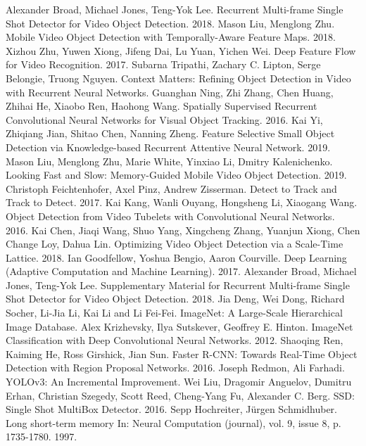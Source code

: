 \documentclass[conference]{IEEEtran}
\begin{document}
\begin{thebibliography}{00}
 Alexander Broad, Michael Jones, Teng-Yok Lee. Recurrent Multi-frame Single Shot Detector for Video Object Detection. 2018.
 Mason Liu, Menglong Zhu. Mobile Video Object Detection with Temporally-Aware Feature Maps. 2018.
 Xizhou Zhu, Yuwen Xiong, Jifeng Dai, Lu Yuan, Yichen Wei. Deep Feature Flow for Video Recognition. 2017.
 Subarna Tripathi, Zachary C. Lipton, Serge Belongie, Truong Nguyen. Context Matters: Refining Object Detection in Video with Recurrent Neural Networks.
 Guanghan Ning, Zhi Zhang, Chen Huang, Zhihai He, Xiaobo Ren, Haohong Wang. Spatially Supervised Recurrent Convolutional Neural Networks for Visual Object Tracking. 2016.
 Kai Yi, Zhiqiang Jian, Shitao Chen, Nanning Zheng. Feature Selective Small Object Detection via Knowledge-based Recurrent Attentive Neural Network. 2019.
 Mason Liu, Menglong Zhu, Marie White, Yinxiao Li, Dmitry Kalenichenko. Looking Fast and Slow: Memory-Guided Mobile Video Object Detection. 2019.
 Christoph Feichtenhofer, Axel Pinz, Andrew Zisserman. Detect to Track and Track to Detect. 2017.
 Kai Kang, Wanli Ouyang, Hongsheng Li, Xiaogang Wang. Object Detection from Video Tubelets with Convolutional Neural Networks. 2016.
 Kai Chen, Jiaqi Wang, Shuo Yang, Xingcheng Zhang, Yuanjun Xiong, Chen Change Loy, Dahua Lin. Optimizing Video Object Detection via a Scale-Time Lattice. 2018.
 Ian Goodfellow, Yoshua Bengio, Aaron Courville. Deep Learning (Adaptive Computation and Machine Learning). 2017.
 Alexander Broad, Michael Jones, Teng-Yok Lee. Supplementary Material for Recurrent Multi-frame Single Shot Detector for Video Object Detection. 2018.
 Jia Deng, Wei Dong, Richard Socher, Li-Jia Li, Kai Li and Li Fei-Fei. ImageNet: A Large-Scale Hierarchical Image Database. 
 Alex Krizhevsky, Ilya Sutskever, Geoffrey E. Hinton. ImageNet Classification with Deep Convolutional Neural Networks. 2012.
 Shaoqing Ren, Kaiming He, Ross Girshick, Jian Sun. Faster R-CNN: Towards Real-Time Object Detection with Region Proposal Networks. 2016. 
 Joseph Redmon, Ali Farhadi. YOLOv3: An Incremental Improvement.
 Wei Liu, Dragomir Anguelov, Dumitru Erhan, Christian Szegedy, Scott Reed, Cheng-Yang Fu, Alexander C. Berg. SSD: Single Shot MultiBox Detector. 2016.
 Sepp Hochreiter, Jürgen Schmidhuber. Long short-term memory In: Neural Computation (journal), vol. 9, issue 8, p. 1735-1780. 1997.

\end{thebibliography}
\end{document}
